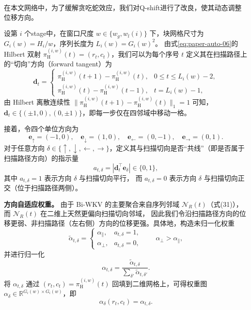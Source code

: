 \documentclass[conference]{IEEEtran}   %
\begin{document}
在本文网络中，为了缓解贪吃蛇效应，我们对Q-shift进行了改良，使其动态调整位移方向。

设第 $i$ 个stage中，在窗口尺度 $w\in\{w_g,w_l(i)\}$ 下，块网格尺寸为 $G_i(w)=H_i/w$，序列长度为 $L_i(w)=G_i(w)^2$。
由式\ref{eq:paper-auto-06}的 Hilbert 双射 $\pi^{(i,w)}_{\mathrm{H}}(t)=(r_t,c_t)$，我们可以为每个序号 $t$ 定义其在扫描路径上的“切向”方向（forward tangent）为
\begin{equation}
\mathbf{d}_t =
\begin{cases}
\pi^{(i,w)}_{\mathrm{H}}(t+1)-\pi^{(i,w)}_{\mathrm{H}}(t), & 0\le t \le L_i(w)-2,\\
\pi^{(i,w)}_{\mathrm{H}}(t)-\pi^{(i,w)}_{\mathrm{H}}(t-1), & t=L_i(w)-1,
\end{cases}
\label{eq:tangent}
\end{equation}
由 Hilbert 离散连续性 $\|\pi^{(i,w)}_{\mathrm{H}}(t+1)-\pi^{(i,w)}_{\mathrm{H}}(t)\|_1=1$ 可知，
$\mathbf{d}_t\in\{(\pm1,0),(0,\pm1)\}$，即每一步仅在四邻域中移动一格。

接着，令四个单位方向为
\begin{equation}
\mathbf{e}_{\uparrow}=(-1,0),\quad 
\mathbf{e}_{\downarrow}=(1,0),\quad
\mathbf{e}_{\leftarrow}=(0,-1),\quad
\mathbf{e}_{\rightarrow}=(0,1).
\end{equation}
对于任意方向 $\delta\in\{\uparrow,\downarrow,\leftarrow,\rightarrow\}$，定义其与扫描切向是否“共线”（即是否属于扫描路径方向）的指示量
\begin{equation}
a_{t,\delta}=|\mathbf{d}_t^\top \mathbf{e}_{\delta}|\in\{0,1\},
\end{equation}
其中 $a_{t,\delta}=1$ 表示方向 $\delta$ 与扫描切向平行，
而 $a_{t,\delta}=0$ 表示方向 $\delta$ 与扫描切向正交（位于扫描路径两侧）。

\textbf{方向自适应权重。}
由于 Bi-WKV 的主要聚合来自序列邻域 $\mathcal{N}_R(t)$（式(31)），而 $\mathcal{N}_R(t)$ 在二维上天然更偏向扫描切向邻域，
因此我们令沿扫描路径方向的位移更弱、非扫描路径（左右侧）方向的位移更强。具体地，构造未归一化权重
\begin{equation}
\tilde{\alpha}_{t,\delta}=
\begin{cases}
\alpha_{\parallel}, & a_{t,\delta}=1,\\
\alpha_{\perp}, & a_{t,\delta}=0,
\end{cases}
\qquad \alpha_{\perp}>\alpha_{\parallel},
\label{eq:alpha_raw}
\end{equation}
并进行归一化
\begin{equation}
\alpha_{t,\delta}=\frac{\tilde{\alpha}_{t,\delta}}{\sum_{\delta'}\tilde{\alpha}_{t,\delta'}}.
\label{eq:alpha_norm}
\end{equation}
将 $\alpha_{t,\delta}$ 通过 $(r_t,c_t)=\pi^{(i,w)}_{\mathrm{H}}(t)$ 回填到二维网格上，可得权重图
$\alpha_{\delta}\in\mathbb{R}^{G_i(w)\times G_i(w)}$，即
\begin{equation}
\alpha_{\delta}(r_t,c_t)=\alpha_{t,\delta}.
\end{equation}
\end{document}
